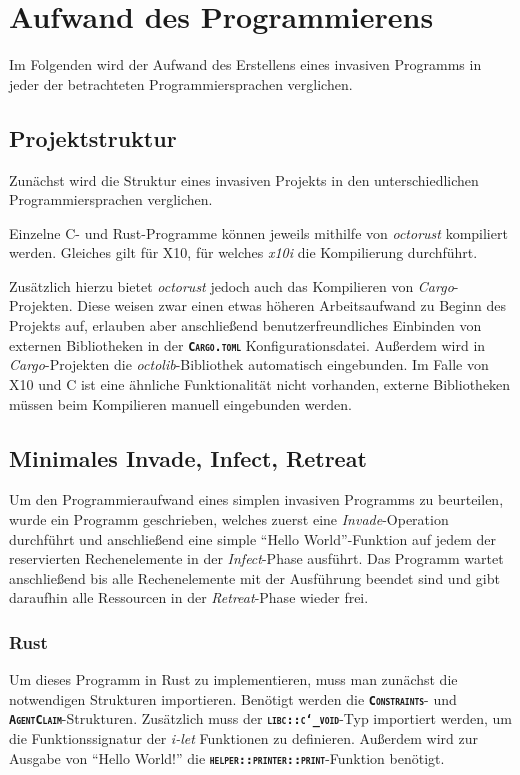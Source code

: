 \section{Aufwand des Programmierens}

Im Folgenden wird der Aufwand des Erstellens eines invasiven Programms in jeder der betrachteten
Programmiersprachen verglichen.

\subsection{Projektstruktur}

Zunächst wird die Struktur eines invasiven Projekts in den unterschiedlichen Programmiersprachen verglichen.

Einzelne C- und Rust-Programme können jeweils mithilfe von \textit{octorust} kompiliert werden.
Gleiches gilt für X10, für welches \textit{x10i} die Kompilierung durchführt.

Zusätzlich hierzu bietet \textit{octorust} jedoch auch das Kompilieren von \textit{Cargo}-Projekten.
Diese weisen zwar einen etwas
höheren Arbeitsaufwand zu Beginn des Projekts auf, erlauben aber anschließend benutzerfreundliches Einbinden von
externen Bibliotheken in der \texttt{\textsc{\textbf{Cargo.toml}}} Konfigurationsdatei. Außerdem wird in
\textit{Cargo}-Projekten die \textit{octolib}-Bibliothek automatisch eingebunden.
Im Falle von X10 und C ist eine ähnliche
Funktionalität nicht vorhanden, externe Bibliotheken müssen beim Kompilieren manuell eingebunden werden.

\subsection{Minimales Invade, Infect, Retreat}

Um den Programmieraufwand eines simplen invasiven Programms zu beurteilen, wurde ein Programm geschrieben, 
welches zuerst eine \textit{Invade}-Operation durchführt und anschließend eine simple "`Hello World"'-Funktion
auf jedem der reservierten Rechenelemente in der \textit{Infect}-Phase ausführt.
Das Programm wartet anschließend bis alle Rechenelemente mit der Ausführung beendet sind und gibt daraufhin
alle Ressourcen in der \textit{Retreat}-Phase wieder frei.

\subsubsection{Rust}

Um dieses Programm in Rust zu implementieren, muss man zunächst die notwendigen Strukturen importieren.
Benötigt werden die \texttt{\textsc{\textbf{Constraints}}}- und \texttt{\textsc{\textbf{AgentClaim}}}-Strukturen.
Zusätzlich muss der \texttt{\textsc{\textbf{libc::c\char`_void}}}-Typ importiert werden,
um die Funktionssignatur der \textit{i-let} Funktionen zu definieren.
Außerdem wird zur Ausgabe von "`Hello World!"' die \texttt{\textsc{\textbf{helper::printer::print}}}-Funktion benötigt.


